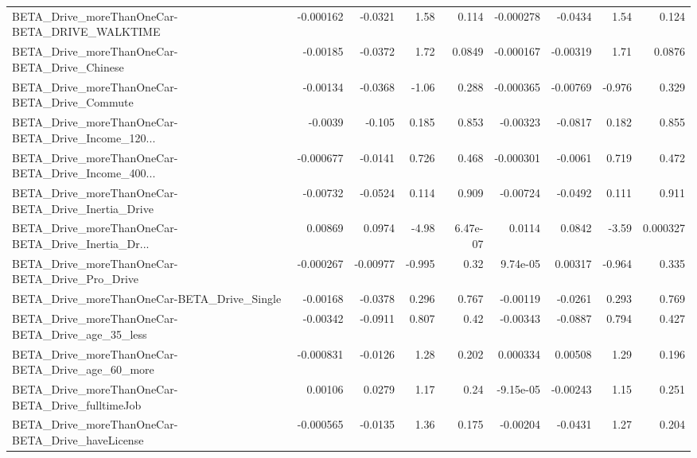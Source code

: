 \begin{tabular}{lrrrrrrrr}
BETA\_Drive\_moreThanOneCar-BETA\_DRIVE\_WALKTIME      &   -0.000162 &      -0.0321 &     1.58 &    0.114 &  -0.000278 &     -0.0434 &         1.54 &         0.124 \\
BETA\_Drive\_moreThanOneCar-BETA\_Drive\_Chinese       &    -0.00185 &      -0.0372 &     1.72 &   0.0849 &  -0.000167 &    -0.00319 &         1.71 &        0.0876 \\
BETA\_Drive\_moreThanOneCar-BETA\_Drive\_Commute       &    -0.00134 &      -0.0368 &    -1.06 &    0.288 &  -0.000365 &    -0.00769 &       -0.976 &         0.329 \\
BETA\_Drive\_moreThanOneCar-BETA\_Drive\_Income\_120... &     -0.0039 &       -0.105 &    0.185 &    0.853 &   -0.00323 &     -0.0817 &        0.182 &         0.855 \\
BETA\_Drive\_moreThanOneCar-BETA\_Drive\_Income\_400... &   -0.000677 &      -0.0141 &    0.726 &    0.468 &  -0.000301 &     -0.0061 &        0.719 &         0.472 \\
BETA\_Drive\_moreThanOneCar-BETA\_Drive\_Inertia\_Drive &    -0.00732 &      -0.0524 &    0.114 &    0.909 &   -0.00724 &     -0.0492 &        0.111 &         0.911 \\
BETA\_Drive\_moreThanOneCar-BETA\_Drive\_Inertia\_Dr... &     0.00869 &       0.0974 &    -4.98 & 6.47e-07 &     0.0114 &      0.0842 &        -3.59 &      0.000327 \\
BETA\_Drive\_moreThanOneCar-BETA\_Drive\_Pro\_Drive     &   -0.000267 &     -0.00977 &   -0.995 &     0.32 &   9.74e-05 &     0.00317 &       -0.964 &         0.335 \\
BETA\_Drive\_moreThanOneCar-BETA\_Drive\_Single        &    -0.00168 &      -0.0378 &    0.296 &    0.767 &   -0.00119 &     -0.0261 &        0.293 &         0.769 \\
BETA\_Drive\_moreThanOneCar-BETA\_Drive\_age\_35\_less   &    -0.00342 &      -0.0911 &    0.807 &     0.42 &   -0.00343 &     -0.0887 &        0.794 &         0.427 \\
BETA\_Drive\_moreThanOneCar-BETA\_Drive\_age\_60\_more   &   -0.000831 &      -0.0126 &     1.28 &    0.202 &   0.000334 &     0.00508 &         1.29 &         0.196 \\
BETA\_Drive\_moreThanOneCar-BETA\_Drive\_fulltimeJob   &     0.00106 &       0.0279 &     1.17 &     0.24 &  -9.15e-05 &    -0.00243 &         1.15 &         0.251 \\
BETA\_Drive\_moreThanOneCar-BETA\_Drive\_haveLicense   &   -0.000565 &      -0.0135 &     1.36 &    0.175 &   -0.00204 &     -0.0431 &         1.27 &         0.204 \\

\end{tabular}
